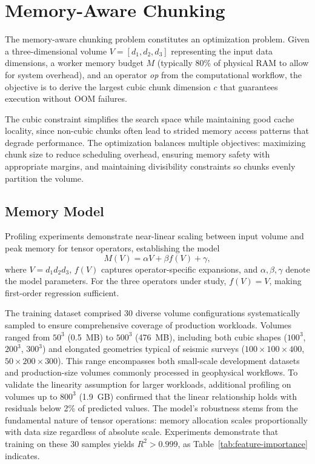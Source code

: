\section{Memory-Aware Chunking}
\label{sec:methodology}

The memory-aware chunking problem constitutes an optimization problem.
Given a three-dimensional volume $V=[d_1,d_2,d_3]$ representing the input data dimensions, a worker memory budget $M$ (typically 80\% of physical \ac{RAM} to allow for system overhead), and an operator \textit{op} from the computational workflow, the objective is to derive the largest cubic chunk dimension $c$ that guarantees execution without \ac{OOM} failures.

The cubic constraint simplifies the search space while maintaining good cache locality, since non-cubic chunks often lead to strided memory access patterns that degrade performance.
The optimization balances multiple objectives: maximizing chunk size to reduce scheduling overhead, ensuring memory safety with appropriate margins, and maintaining divisibility constraints so chunks evenly partition the volume.

\subsection{Memory Model}

Profiling experiments demonstrate near-linear scaling between input volume and peak memory for tensor operators, establishing the model
\begin{equation}
M(V)=\alpha V+\beta f(V)+\gamma,\label{eq:model}
\end{equation}
where $V=d_1d_2d_3$, $f(V)$ captures operator-specific expansions, and $\alpha,\beta,\gamma$ denote the model parameters.
For the three operators under study, $f(V)=V$, making first-order regression sufficient.

The training dataset comprised 30 diverse volume configurations systematically sampled to ensure comprehensive coverage of production workloads.
Volumes ranged from $50^3$ (0.5~MB) to $500^3$ (476~MB), including both cubic shapes ($100^3$, $200^3$, $300^3$) and elongated geometries typical of seismic surveys ($100 \times 100 \times 400$, $50 \times 200 \times 300$).
This range encompasses both small-scale development datasets and production-size volumes commonly processed in geophysical workflows.
To validate the linearity assumption for larger workloads, additional profiling on volumes up to $800^3$ (1.9~GB) confirmed that the linear relationship holds with residuals below 2\% of predicted values.
The model's robustness stems from the fundamental nature of tensor operations: memory allocation scales proportionally with data size regardless of absolute scale.
Experiments demonstrate that training on these 30 samples yields $R^2>0.999$, as Table~\ref{tab:feature-importance} indicates.

